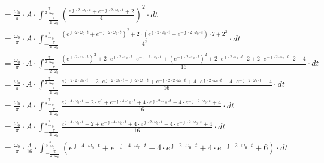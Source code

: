 \begin{task}
\begin{align*}
&=\frac{\omega_0}{\pi} \cdot A \cdot \int_{-\frac{\pi}{2\cdot\omega_0}}^{\frac{\pi}{2\cdot\omega_0}} \left(  \frac{e^{\jmath \cdot 2 \cdot \omega_0 \cdot t}+e^{-\jmath \cdot 2 \cdot \omega_0 \cdot t}+2}{4} \right)^2 \cdot dt\\
&=\frac{\omega_0}{\pi} \cdot A \cdot \int_{-\frac{\pi}{2\cdot\omega_0}}^{\frac{\pi}{2\cdot\omega_0}} \frac{\left(e^{\jmath \cdot 2 \cdot \omega_0 \cdot t}+e^{-\jmath \cdot 2 \cdot \omega_0 \cdot t}\right)^2+2\cdot \left(e^{\jmath \cdot 2 \cdot \omega_0 \cdot t}+e^{-\jmath \cdot 2 \cdot \omega_0 \cdot t}\right) \cdot 2 + 2^2}{4^2} \cdot dt\\
&=\frac{\omega_0}{\pi} \cdot A \cdot \int_{-\frac{\pi}{2\cdot\omega_0}}^{\frac{\pi}{2\cdot\omega_0}} \frac{\left(e^{\jmath \cdot 2 \cdot \omega_0 \cdot t}\right)^2+2\cdot e^{\jmath \cdot 2 \cdot \omega_0 \cdot t}\cdot e^{-\jmath \cdot 2 \cdot \omega_0 \cdot t} +\left(e^{-\jmath \cdot 2 \cdot \omega_0 \cdot t}\right)^2+2\cdot e^{\jmath \cdot 2 \cdot \omega_0 \cdot t}\cdot 2 +2\cdot e^{-\jmath \cdot 2 \cdot \omega_0 \cdot t} \cdot 2 + 4}{16} \cdot dt\\
&=\frac{\omega_0}{\pi} \cdot A \cdot \int_{-\frac{\pi}{2\cdot\omega_0}}^{\frac{\pi}{2\cdot\omega_0}} \frac{e^{\jmath \cdot 2 \cdot 2 \cdot \omega_0 \cdot t}+2\cdot e^{\jmath \cdot 2 \cdot \omega_0 \cdot t -\jmath \cdot 2 \cdot \omega_0 \cdot t} +e^{-\jmath \cdot 2 \cdot 2 \cdot \omega_0 \cdot t} +4\cdot e^{\jmath \cdot 2 \cdot \omega_0 \cdot t} +4\cdot e^{-\jmath \cdot 2 \cdot \omega_0 \cdot t} + 4}{16} \cdot dt\\
&=\frac{\omega_0}{\pi} \cdot A \cdot \int_{-\frac{\pi}{2\cdot\omega_0}}^{\frac{\pi}{2\cdot\omega_0}} \frac{e^{\jmath \cdot 4 \cdot \omega_0 \cdot t}+2\cdot e^{0} +e^{-\jmath \cdot 4 \cdot \omega_0 \cdot t} +4\cdot e^{\jmath \cdot 2 \cdot \omega_0 \cdot t} +4\cdot e^{-\jmath \cdot 2 \cdot \omega_0 \cdot t} + 4}{16} \cdot dt\\
&=\frac{\omega_0}{\pi} \cdot A \cdot \int_{-\frac{\pi}{2\cdot\omega_0}}^{\frac{\pi}{2\cdot\omega_0}} \frac{e^{\jmath \cdot 4 \cdot \omega_0 \cdot t}+2 +e^{-\jmath \cdot 4 \cdot \omega_0 \cdot t} +4\cdot e^{\jmath \cdot 2 \cdot \omega_0 \cdot t} +4\cdot e^{-\jmath \cdot 2 \cdot \omega_0 \cdot t} + 4}{16} \cdot dt\\
&=\frac{\omega_0}{\pi} \cdot \frac{A}{16} \cdot \int_{-\frac{\pi}{2\cdot\omega_0}}^{\frac{\pi}{2\cdot\omega_0}} \left( e^{\jmath \cdot 4 \cdot \omega_0 \cdot t}+e^{-\jmath \cdot 4 \cdot \omega_0 \cdot t} +4\cdot e^{\jmath \cdot 2 \cdot \omega_0 \cdot t} +4\cdot e^{-\jmath \cdot 2 \cdot \omega_0 \cdot t} + 6\right)\cdot dt\\

\end{align*}
\end{task}

